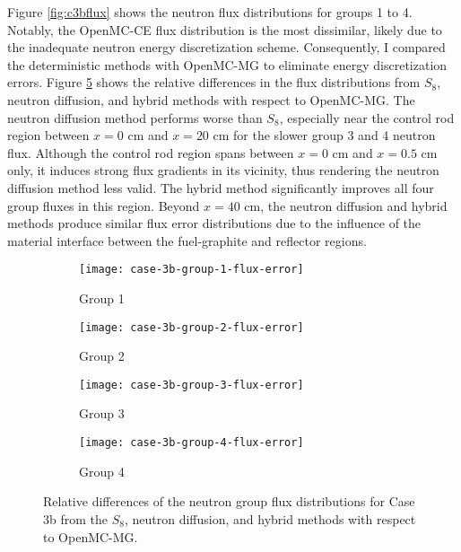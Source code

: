 Figure \ref{fig:c3bflux} shows the neutron flux distributions for groups 1 to 4. Notably, the
OpenMC-CE flux distribution is the most dissimilar, likely due to
the inadequate neutron energy discretization scheme. Consequently, I compared the
deterministic methods with OpenMC-MG to eliminate energy discretization errors. Figure
\ref{fig:c3bfluxe} shows the relative differences in the flux distributions from $S_8$, neutron
diffusion, and hybrid methods with respect to OpenMC-MG. The neutron diffusion method
performs worse than $S_8$, especially near the control rod region between $x=0$ cm and $x=20$ cm
for the slower group 3 and 4 neutron flux. Although the control rod region spans between $x=0$ cm
and $x=0.5$ cm only, it induces strong flux gradients in its vicinity, thus rendering the neutron
diffusion method less valid. The hybrid method significantly improves all four
group fluxes in this region. Beyond $x=40$ cm, the neutron diffusion and hybrid methods produce
similar flux error distributions due to the influence of the material interface between the
fuel-graphite and reflector regions.

\begin{figure}[htb!]
  \centering
  \begin{subfigure}[t]{.49\textwidth}
    \centering
    \texttt{[image: case-3b-group-1-flux-error]}
    \caption{Group 1}
    \label{fig:c3bg1e}
  \end{subfigure}
  \hfill
  \begin{subfigure}[t]{.49\textwidth}
    \centering
    \texttt{[image: case-3b-group-2-flux-error]}
    \caption{Group 2}
    \label{fig:c3bg2e}
  \end{subfigure}
  \begin{subfigure}[t]{.49\textwidth}
    \centering
    \texttt{[image: case-3b-group-3-flux-error]}
    \caption{Group 3}
    \label{fig:c3bg3e}
  \end{subfigure}
  \hfill
  \begin{subfigure}[t]{.49\textwidth}
    \centering
    \texttt{[image: case-3b-group-4-flux-error]}
    \caption{Group 4}
    \label{fig:c3bg4e}
  \end{subfigure}
  \caption{Relative differences of the neutron group flux distributions for Case 3b from the $S_8$,
    neutron diffusion, and hybrid methods with respect to OpenMC-MG.}
  \label{fig:c3bfluxe}
\end{figure}

